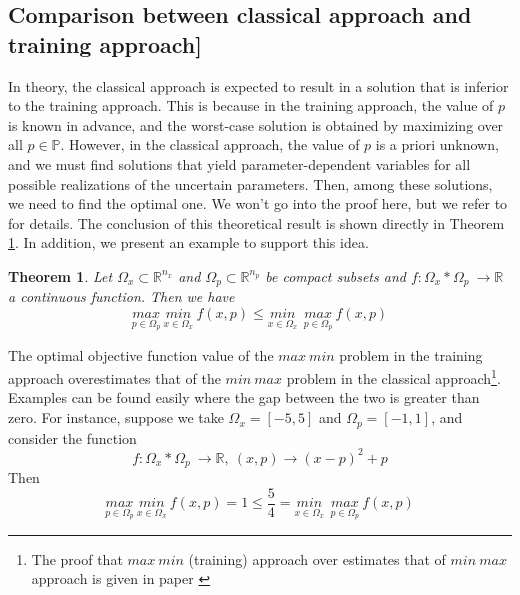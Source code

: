 \documentclass  [
  paper    = a4,
  BCOR     = 10mm,
  twoside,
  fontsize = 12pt,
  fleqn,
  toc      = bibnumbered,
  toc      = listofnumbered,
  numbers  = noendperiod,
  headings = normal,
  listof   = leveldown,
  version  = 3.03
]                                       {scrreprt}
\newcommand{\<}{\langle}
\renewcommand{\>}{\rangle}
\newtheorem{theorem}{Theorem}
\begin{document}
  
\subsection{Comparison between classical approach and training approach]}
\label{Comparison}
In theory, the classical approach is expected to result in a solution that is inferior to the training approach. This is because in the training approach, the value of $p$ is known in advance, and the worst-case solution is obtained by maximizing over all $p \in \mathbb{P}$. However, in the classical approach, the value of $p$ is a priori unknown, and we must find solutions that yield parameter-dependent variables for all possible realizations of the uncertain parameters. Then, among these solutions, we need to find the optimal one. We won't go into the proof here, but we refer to \cite{MatSch22} for details. The conclusion of this theoretical result is shown directly in Theorem \ref{Theorem_compare}. In addition, we present an example to support this idea.



\begin{theorem} Let $\Omega_x \subset \mathbb{R}^{n_x}$ and $\Omega_p \subset \mathbb{R}^{n_p}$ be compact subsets and $f : \Omega_x *  \Omega_p \  \rightarrow \mathbb{R}$ a continuous function. Then we have
	\begin{equation}
	\underset{p \in \Omega_p}{max}\ \underset{x \in \Omega_x}{min}\ f (x,p) \leq \underset{x \in \Omega_x}{min}\ \ \underset{p \in \Omega_p}{max}\ f (x,p)
	\end{equation}
\label{Theorem_compare}
\end{theorem}

The optimal objective function value of the $max\ min$ problem in the training approach overestimates that of the $min\ max$ problem in the classical approach\footnote{The proof that $max\ min$  (training) approach over estimates that of $min \ max$ approach is given in paper \cite{MatSch22}}. Examples can be found easily where the gap between the two is greater than zero. For instance, suppose we take $\Omega_x=[-5,5]$ and $\Omega_p=[-1,1]$, and consider the function
$$
f : \Omega_x *  \Omega_p \  \rightarrow \mathbb{R}, \ (x,p) \rightarrow (x-p)^2 + p
$$
Then
$$	\underset{p \in \Omega_p}{max}\ \underset{x \in \Omega_x}{min}\ f (x,p) =1 \leq \frac{5}{4} = \underset{x \in \Omega_x}{min}\ \ \underset{p \in \Omega_p}{max}\ f (x,p)
$$
\end{document}
